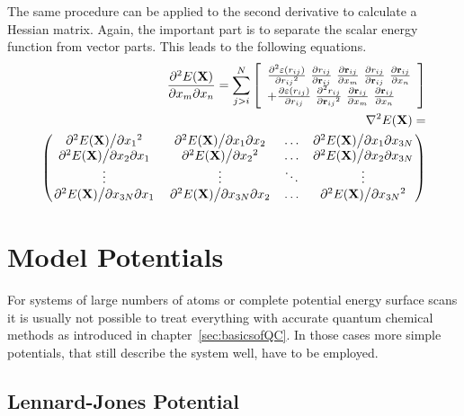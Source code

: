 The same procedure can be applied to the second derivative to calculate a
Hessian matrix. Again, the important part is to separate the scalar energy
function from vector parts. This leads to the following equations.
%
\begin{align}
    \pdv{E(\mathbf{X})}{x_m}{x_n}=\sum_{j>i}^N\left[  
    \begin{array}{ll}
    \pdv[2]{\varepsilon(r_{ij})}{{r_{ij}}}\  
    \pdv{r_{ij}}{\mathbf{r}_{ij}}\ 
    \pdv{\mathbf{r}_{ij}}{x_m}\ 
    \pdv{r_{ij}}{\mathbf{r}_{ij}}\ 
    \pdv{\mathbf{r}_{ij}}{x_n} \\ 
    +
    \pdv{\varepsilon(r_{ij})}{r_{ij}}\
        \pdv[2]{r_{ij}}{{\mathbf{r}_{ij}}}\ 
    \pdv{\mathbf{r}_{ij}}{x_m}\ 
    \pdv{\mathbf{r}_{ij}}{x_n} 
    \end{array}
    \right]\\
    \begin{aligned}
    \nabla^2 E(\mathbf{X})=\\
    \begin{pmatrix}
        \pdv*[2]{E(\mathbf{X})}{{x_1}} & \pdv*{E(\mathbf{X})}{x_1}{x_2} & \ldots & \pdv*{E(\mathbf{X})}{x_1}{x_{3N}}\\
        \pdv*{E(\mathbf{X})}{x_2}{x_1} & \pdv*[2]{E(\mathbf{X})}{{x_2}} & \ldots & \pdv*{E(\mathbf{X})}{x_2}{x_{3N}}\\
        \vdots & \vdots & \ddots & \vdots\\
        \pdv*{E(\mathbf{X})}{x_{3N}}{x_1} & \pdv*{E(\mathbf{X})}{x_{3N}}{x_2} & \ldots & \pdv*[2]{E(\mathbf{X})}{{x_{3N}}}
    \end{pmatrix}
    \end{aligned}
\end{align}



\chapter{Model Potentials}
\label{sec:energylandscapes}

For systems of large numbers of atoms or complete potential energy surface
scans it is usually not possible to treat everything with accurate quantum
chemical methods as introduced in chapter~\ref{sec:basicsofQC}. In those cases
more simple potentials, that still describe the system well, have to be
employed. 

\section{Lennard-Jones Potential}
\label{sec:LennardJones}

